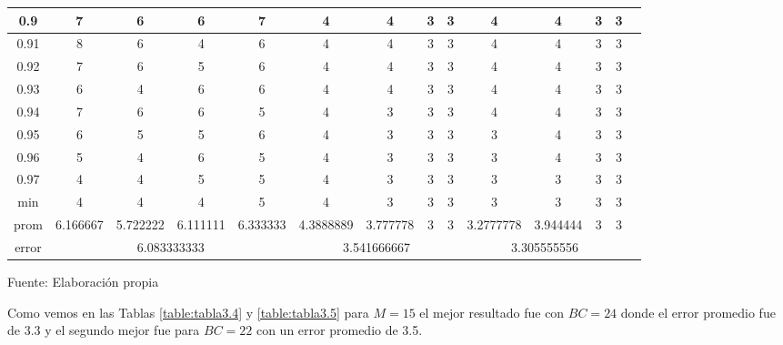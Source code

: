 \begin{center}
\begin{table}[H]
{\begin{tabular}{|c|c|c|c|c|c|c|c|c|c|c|c|c|c|}
\hline 
0.9 & 
7 & 6 & 6 & 7 & 4 & 4 & 3 & 3 & 4 & 4 & 3 & 3 \\
\hline 
0.91 & 
8 & 6 & 4 & 6 & 4 & 4 & 3 & 3 & 4 & 4 & 3 & 3 \\
\hline 
0.92 & 
7 & 6 & 5 & 6 & 4 & 4 & 3 & 3 & 4 & 4 & 3 & 3 \\
\hline 
0.93 & 
6 & 4 & 6 & 6 & 4 & 4 & 3 & 3 & 4 & 4 & 3 & 3 \\
\hline 
0.94 & 
7 & 6 & 6 & 5 & 4 & 3 & 3 & 3 & 4 & 4 & 3 & 3 \\
\hline 
0.95 & 
6 & 5 & 5 & 6 & 4 & 3 & 3 & 3 & 3 & 4 & 3 & 3 \\
\hline 
0.96 & 
5 & 4 & 6 & 5 & 4 & 3 & 3 & 3 & 3 & 4 & 3 & 3 \\
\hline 
0.97 & 
4 & 4 & 5 & 5 & 4 & 3 & 3 & 3 & 3 & 3 & 3 & 3 \\
\hline 
min & 
4 & 4 & 4 & 5 & 4 & 3 & 3 & 3 & 3 & 3 & 3 & 3 \\
\hline 
prom & 
6.166667 & 5.722222 & 6.111111 & 6.333333 & 4.3888889 & 3.777778 & 3 & 3 & 3.2777778 & 3.944444 & 3 & 3 \\
\hline 
error & 
\multicolumn{4}{c|}{6.083333333} & 
\multicolumn{4}{c|}{3.541666667} & 
\multicolumn{4}{c|}{3.305555556}\\ 
\hline 
\end{tabular} 
}
\begin{center}
\vskip 0.2cm
{\small{Fuente: Elaboración propia}}
\end{center}
\end{table}
\end{center}

\vskip -0.5cm
Como vemos en las Tablas \ref{table:tabla3.4} y \ref{table:tabla3.5} para $M = 15$ el mejor resultado fue con $BC = 24$ donde el error promedio fue de 3.3 y el segundo mejor fue para $BC = 22$ con un error promedio de 3.5.
\vskip -0.5cm

